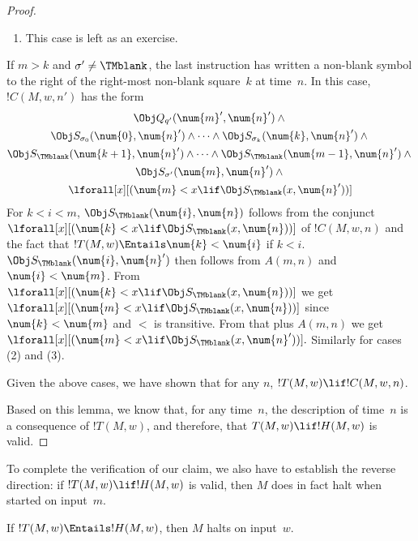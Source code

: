 \documentclass[../../../include/open-logic-section]{subfiles}
\begin{document}
\begin{proof}
\begin{enumerate}
\item This case is left as an exercise.
\end{enumerate}
If $m > k$ and $\sigma' \neq \TMblank$, the last instruction has
written a non-blank symbol to the right of the right-most non-blank
square~$k$ at time~$n$. In this case, $!C(M, w, n')$ has the form
\begin{multline*}
\Obj Q_{q'}(\num{m}', \num{n}') \land {}\\
\Obj S_{\sigma_0}(\num{0}, \num{n}') \land \dots \land
\Obj S_{\sigma_k}(\num{k}, \num{n}') \land {}\\
\Obj S_{\TMblank}(\num{k+1}, \num{n}') \land \dots \land
\Obj S_{\TMblank}(\num{m-1}, \num{n}') \land {}\\
\Obj S_{\sigma'}(\num{m},
\num{n}') \land {}\\
\lforall[x][(\num{m} < x
  \lif \Obj S_\TMblank(x, \num{n}'))]
\end{multline*}
For $k < i < m$, $\Obj S_{\TMblank}(\num{i}, \num{n})$ follows from
the conjunct $\lforall[x][(\num{k} < x \lif \Obj S_\TMblank(x,
  \num{n}))]$ of $!C(M, w, n)$ and the fact that $!T(M, w) \Entails
\num{k} < \num{i}$ if $k < i$. $\Obj S_{\TMblank}(\num{i}, \num{n}')$
then follows from $A(m, n)$ and $\num{i} < \num{m}$.  From
$\lforall[x][(\num{k} < x \lif \Obj S_\TMblank(x, \num{n}))]$ we get
$\lforall[x][(\num{m} < x \lif \Obj S_\TMblank(x, \num{n}))]$ since
$\num{k}<\num{m}$ and $<$ is transitive.  From that plus $A(m, n)$ we
get $\lforall[x][(\num{m} < x \lif \Obj S_\TMblank(x, \num{n}'))].$
Similarly for cases (2) and (3).

Given the above cases, we have shown that for any $n$, $!T(M, w) \lif !C(M,
w, n)$.

Based on this lemma, we know that, for any time~$n$, the description of
time~$n$ is a consequence of $!T(M, w)$, and therefore, that $T(M, w) \lif
!H(M, w)$ is valid.

\end{proof}

\begin{explain} 
To complete the verification of our claim, we also have to
establish the reverse direction: if $!T(M, w) \lif !H(M, w)$ is valid, then
$M$ does in fact halt when started on input~$m$. 
\end{explain}

\begin{lem}
If $!T(M, w) \Entails !H(M, w)$, then $M$ halts on input~$w$.
\end{lem}
\end{document}
